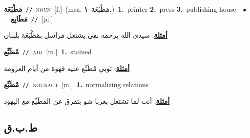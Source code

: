 \documentclass[10pt,a4paper,twoside]{article} %
\begin{document}
\begin{multicols}{2}
{{{{{{{{{{{{{\setlength\topsep{0pt}\textbf{\foreignlanguage{arabic}{مَطْبَعَة}}\ {\color{gray}\texttt{//}\color{black}}\ \textsc{noun}\ [f.]\ \color{gray}(msa. \foreignlanguage{arabic}{مَطْبَعَة}~\foreignlanguage{arabic}{\textbf{١.}})\color{black}\ \textbf{1.}~printer  \textbf{2.}~press  \textbf{3.}~publishing house\ \ $\bullet$\ \ \setlength\topsep{0pt}\textbf{\foreignlanguage{arabic}{مَطَابِع}}\ {\color{gray}\texttt{//}\color{black}}\ [pl.]\  \begin{flushright}\color{gray}\foreignlanguage{arabic}{\textbf{\underline{\foreignlanguage{arabic}{أمثلة}}}: سيدي الله يرحمه بقى يشتغل مراسل بمَطْبَعَة بلبنان}\end{flushright}\color{black}} \vspace{2mm}

{\setlength\topsep{0pt}\textbf{\foreignlanguage{arabic}{مْطَبِّع}}\ {\color{gray}\texttt{//}\color{black}}\ \textsc{adj}\ [m.]\ \textbf{1.}~stained\  \begin{flushright}\color{gray}\foreignlanguage{arabic}{\textbf{\underline{\foreignlanguage{arabic}{أمثلة}}}: ثوبي مْطَبِّع عليه قهوة من أيام العزومة}\end{flushright}\color{black}} \vspace{2mm}

{\setlength\topsep{0pt}\textbf{\foreignlanguage{arabic}{مْطَبِّع}}\ {\color{gray}\texttt{//}\color{black}}\ \textsc{noun\textunderscore act}\ [m.]\ \textbf{1.}~normalizing relations\  \begin{flushright}\color{gray}\foreignlanguage{arabic}{\textbf{\underline{\foreignlanguage{arabic}{أمثلة}}}: أنت لما تشتغل بغربا شو بتفرق عن المطَبِّع مع اليهود}\end{flushright}\color{black}} \vspace{2mm}

\vspace{-3mm}
\subsection*{\color{blue}\foreignlanguage{arabic}{ط.ب.ق}\color{blue}{}} 

}}}}}}}}}}}}
\end{multicols}
\end{document}
